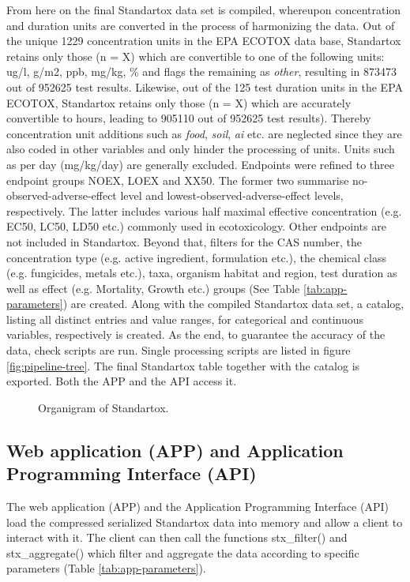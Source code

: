 From here on the final Standartox data set is compiled, whereupon concentration and duration units are converted in the process of harmonizing the data. Out of the unique 1229 concentration units in the EPA ECOTOX data base, Standartox retains only those (n = X) which are convertible to one of the following units: ug/l, g/m2, ppb, mg/kg, \% and flags the remaining as \textit{other}, resulting in 873473 out of 952625 test results. Likewise, out of the 125 test duration units in the EPA ECOTOX, Standartox retains only those (n = X) which are accurately convertible to hours, leading to 905110 out of 952625 test results). Thereby concentration unit additions such as \textit{food}, \textit{soil}, \textit{ai} etc. are neglected since they are also coded in other variables and only hinder the processing of units. Units such as per day (mg/kg/day) are generally excluded. Endpoints were refined to three endpoint groups NOEX, LOEX and XX50. The former two summarise no-observed-adverse-effect level and lowest-observed-adverse-effect levels, respectively. The latter includes various half maximal effective concentration (e.g. EC50, LC50, LD50 etc.) commonly used in ecotoxicology. Other endpoints are not included in Standartox. Beyond that, filters for the CAS number, the concentration type (e.g. active ingredient, formulation etc.), the chemical class (e.g. fungicides, metals etc.), taxa, organism habitat and region, test duration as well as effect (e.g. Mortality, Growth etc.) groups (See Table \ref{tab:app-parameters}) are created. Along with the compiled Standartox data set, a catalog, listing all distinct entries and value ranges, for categorical and continuous variables, respectively is created. As the end, to guarantee the accuracy of the data, check scripts are run. Single processing scripts are listed in figure \ref{fig:pipeline-tree}. The final Standartox table together with the catalog is exported. Both the APP and the API access it.

\begin{figure}
    
    \caption{Organigram of Standartox.}
    \label{fig:stx-organigram}
\end{figure}

\subsection*{Web application (APP) and Application Programming Interface (API)}
The web application (APP) and the Application Programming Interface (API) load the compressed serialized Standartox data into memory and allow a client to interact with it. The client can then call the functions stx\_filter() and stx\_aggregate() which filter and aggregate the data according to specific parameters (Table \ref{tab:app-parameters}).


